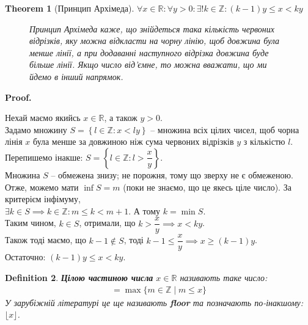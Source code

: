 \documentclass[a4paper, 14pt]{article}
\makeatletter
\def\qed{$\blacksquare$}
\theoremstyle{theoremdd}
\newtheorem{theorem}{Theorem}[subsection]
\theoremstyle{theoremdd}
\newtheorem{definition}[theorem]{Definition}
\theoremstyle{theoremdd}
\theoremstyle{theoremdd}
\theoremstyle{theoremdd}
\theoremstyle{theoremdd}
\theoremstyle{theoremdd}
\theoremstyle{theoremdd}
\renewenvironment{proof}[1][Proof.\\]{\par
\pushQED{\hfill \qed}%
\normalfont \topsep6\p@\@plus6\p@\relax
\trivlist
\item\relax
{\bfseries
#1\@addpunct{.}}\hspace\labelsep\ignorespaces
}{%
\popQED\endtrivlist\@endpefalse
}
\makeatother
\begin{document}
	\begin{theorem}[Принцип Архімеда]
	$\forall x \in \mathbb{R}: \forall y > 0: \exists ! k \in \mathbb{Z}: (k-1)y \leq x < ky$
	\begin{figure}[H]
	\qquad
	\caption*{Принцип Архімеда каже, що знійдеться така кількість червоних відрізків, яку можна відкласти на чорну лінію, щоб довжина була менше лінії, а при додаванні наступного відрізка довжина буде більше лінії. Якщо число від'ємне, то можна вважати, що ми йдемо в інший напрямок.}
	\end{figure}
	\end{theorem}
	
	\begin{proof}
	Нехай маємо якийсь $x \in \mathbb{R}$, а також $y > 0$.\\
	Задамо множину $S = \left\{l \in \mathbb{Z} :  x < ly \right\}$ -- множина всіх цілих чисел, щоб чорна лінія $x$ була менше за довжиною ніж сума червоних відрізків $y$ з кількістю $l$. Перепишемо інакше: $S = \left\{l \in \mathbb{Z} :  l > \dfrac{x}{y} \right\}$.\\
	Множина $S$ -- обмежена знизу; не порожня, тому що зверху не є обмеженою. Отже, можемо мати $\inf S = m$ (поки не знаємо, що це якесь ціле число). За критерієм інфімуму, \\
	$\exists k \in S \implies k \in \mathbb{Z}: m \leq k < m+1$. А тому $k = \min S$.\\
	Таким чином, $k \in S$, отримали, що $k > \dfrac{x}{y} \implies x < ky$.\\
	Також тоді маємо, що $k-1 \notin S$, тоді $k-1 \leq \dfrac{x}{y} \implies x \geq (k-1)y$.\\
	Остаточно: $(k-1)y \leq x < ky$.
	\end{proof}
	
	\begin{definition}
	\textbf{Цілою частиною числа} $x \in \mathbb{R}$ називають таке число:
	\begin{align*}
	[x] = \max \{ m \in \mathbb{Z} \mid m \leq x\}
	\end{align*}
	У зарубіжній літературі це ще називають \textbf{floor} та позначають по-інакшому: $\lfloor x \rfloor$.
	\end{definition}
	
\end{document}
